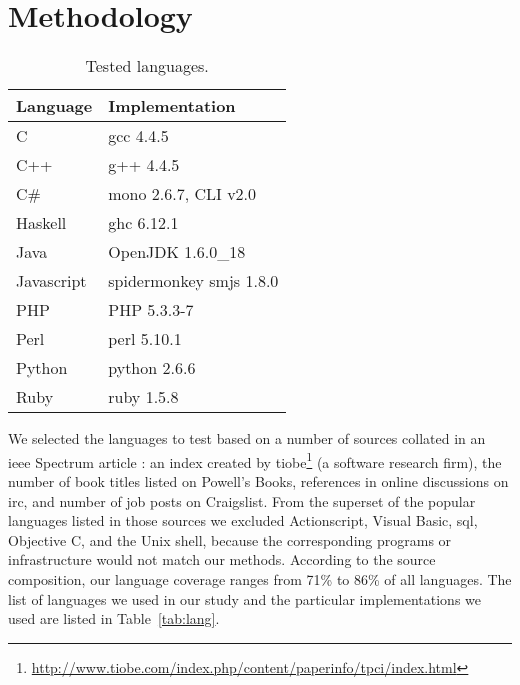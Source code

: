 \documentclass[10pt]{sigplanconf}
\begin{document}
\section{Methodology} %
\begin{table}
\begin{center}
\caption{Tested languages.}
\label{tab:langs}
\begin{tabular}{ l l}
 \hline
Language & Implementation \\
\hline
C 		& gcc 4.4.5 \\
C++ 		& g++ 4.4.5 \\
C\# 		& mono 2.6.7, CLI v2.0 \\
Haskell 	& ghc 6.12.1 \\
Java 		& OpenJDK 1.6.0\_18 \\
Javascript 	& spidermonkey smjs 1.8.0 \\
PHP 		& PHP 5.3.3-7 \\
Perl 		& perl 5.10.1 \\
Python 		& python 2.6.6 \\
Ruby 		& ruby 1.5.8 \\
\hline
\end{tabular}
\end{center}
\end{table}

We selected the languages to test based on a number of sources
collated in an {\sc ieee} Spectrum article \cite{Kin11}:
an index created by
{\sc tiobe}\footnote{\url{http://www.tiobe.com/index.php/content/paperinfo/tpci/index.html}} (a software research firm),
the number of book titles listed on Powell's Books,
references in online discussions on {\sc irc}, and
number of job posts on Craigslist.
From the superset of the popular languages listed in those
sources we excluded
Actionscript, Visual Basic, {\sc sql}, Objective C, and the Unix shell,
because the corresponding programs or infrastructure would not match our methods.
According to the source composition,
our language coverage ranges from 71\% to 86\% of all languages.
The list of languages we used in our study and the
particular implementations we used are listed in
Table~\ref{tab:lang}.
\end{document}
